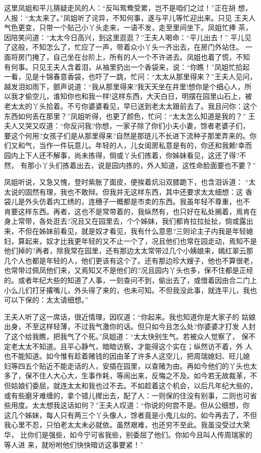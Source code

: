这里凤姐和平儿猜疑走风的人：“反叫鸳鸯受累，岂不是咱们之过！”正在胡
想，人报：“太太来了。”凤姐听了诧异，不知何事，遂与平儿等忙迎出来。只见
王夫人气色更变，只带一个贴己小丫头走来，一语不发，走至里间坐下。凤姐忙捧
茶，因陪笑问道：“太太今日高兴，到这里逛逛？”王夫人喝命：“平儿出去！”
平儿见了这般，不知怎么了，忙应了一声，带着众小丫头一齐出去，在房门外站住。
一面将房门掩了，自己坐在台阶上，所有的人一个不许进去。凤姐也着了慌，不知
有何事。只见王夫人含着泪，从袖里扔出一个香袋来，说：“你瞧！”凤姐忙拾起
一看，见是十锦春意香袋，也吓了一跳，忙问：“太太从那里得来？”王夫人见问，
越发泪如雨下，颤声说道：“我从那里得来?我天天坐在井里!想你是个细心人，所
以我才偷空儿，谁知你也和我一样!这样东西，大天白日，明摆在园里山石上，被
老太太的丫头拾着。不亏你婆婆看见，早已送到老太太跟前去了。我且问你：这个
东西如何丢在那里？”凤姐听得，也更了颜色，忙问：“太太怎么知道是我的？”
王夫人又哭又叹道：“你反问我?你想，一家子除了你们小夫小妻，馀者老婆子们，
要这个何用?女孩子们是从那里得来?自然是那琏儿不长进下流种子那里弄来的。你
们又和气，当作一件玩意儿。年轻的人，儿女闺房私意是有的，你还和我赖!幸而
园内上下人还不解事，尚未拣得，倘或丫头们拣着，你姊妹看见，这还了得?不然，
有那小丫头们拣着出去，说是园内拣的，外人知道，这性命脸面要也不要？”

凤姐听说，又急又愧，登时紫胀了面皮，便挨着炕沿双膝跪下，也含泪诉道：
“太太说的固然有理，我也不敢辩。但我并无这样东西，其中还要求太太细想：这
香袋儿是外头仿着内工绣的，连穗子一概都是市卖的东西。我虽年轻不尊重，也不
肯要这样东西。再者，这也不是常带着的，我纵然有，也只好在私处搁着，焉肯在
身上常带，各处逛去?况且又在园里去，个个姊妹，我们都肯拉拉扯扯，倘或露出
来，不但在姊妹前看见，就是奴才看见，我有什么意思?三则论主子内我是年轻媳
妇，算起来，奴才比我更年轻的又不止一个了，况且他们也常在园走动，焉知不是
他们掉的?再者，除我常在园里，还有那边太太常带过几个小姨娘来，嫣红翠云那
几个人也都是年轻的人，他们更该有这个了。还有那边珍大嫂子，他也不算很老，
也常带过佩凤他们来，又焉知又不是他们的?况且园内丫头也多，保不住都是正经
的。或者年纪大些的知道了人事，一刻查问不到，偷出去了，或借着因由合二门上
小么儿们打牙撂嘴儿，外头得了来的，也未可知。不但我没此事，就连平儿，我也
可以下保的：太太请细想。”

王夫人听了这一席话，很近情理，因叹道：“你起来。我也知道你是大家子的
姑娘出身，不至这样轻薄，不过我气激你的话。但只如今且怎么处?你婆婆才打发
人封了这个给我瞧，把我气了个死。”凤姐道：“太太快别生气。若被众人觉察了，
保不定老太太不知道。且平心静气，暗暗访察，才能得这个实在；纵然访不着，外
人也不能知道。如今惟有趁着赌钱的因由革了许多人这空儿，把周瑞媳妇、旺儿媳
妇等四五个贴近不能走话的人，安插在园里，以查赌为由。再如今他们的丫头也太
多了，保不住人大心大，生事作耗，等闹出来，反悔之不及。如今若无故裁革，不
但姑娘们委屈，就连太太和我也过不去。不如趁着这个机会，以后凡年纪大些的，
或有些磨牙难缠的，拿个错儿撵出去，配了人：一则保的住没有别事，二则也可省
些用度。太太想我这话如何？”王夫人叹道：“你说的何尝不是。但从公细想，你
这几个姊妹，每人只有两三个丫头像人，馀者竟是小鬼儿似的。如今再去了，不但
我心里不忍，只怕老太太未必就依。虽然艰难，也还穷不至此。我虽没受过大荣华，
比你们是强些，如今宁可省我些，别委屈了他们。你如今且叫人传周瑞家的等人进
来，就吩咐他们快快暗访这事要紧！”


